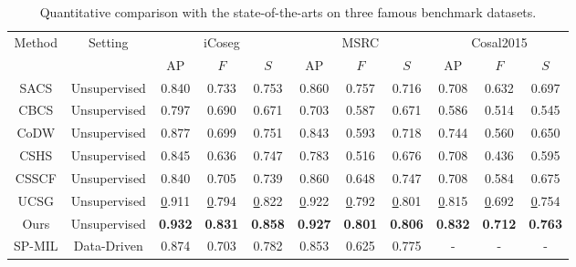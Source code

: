 \documentclass[sigconf]{acmart}
\begin{document}
\begin{table}[!tbp]
\caption{Quantitative comparison with the state-of-the-arts on three famous benchmark datasets.}
\begin{tabular}{c|c|ccc|ccc|ccc}
\toprule
\multirow{2}{*}{Method} & \multirow{2}{*}{Setting} & \multicolumn{3}{c|}{iCoseg}                      & \multicolumn{3}{c|}{MSRC}                        & \multicolumn{3}{c}{Cosal2015}                   \\ \cline{3-11} 
                        &                          & AP             & $F$              & $S$              & AP             & $F$              & $S$              & AP             & $F$              & $S$              \\ \hline
SACS                    & Unsupervised             & 0.840          & 0.733          & 0.753          & 0.860          & 0.757          & 0.716          & 0.708          & 0.632          & 0.697          \\
CBCS                    & Unsupervised             & 0.797          & 0.690          & 0.671          & 0.703          & 0.587          & 0.671          & 0.586          & 0.514          & 0.545          \\
CoDW                    & Unsupervised             & 0.877          & 0.699          & 0.751          & 0.843          & 0.593          & 0.718          & 0.744          & 0.560          & 0.650          \\
CSHS                    & Unsupervised             & 0.845          & 0.636          & 0.747          & 0.783          & 0.516          & 0.676          & 0.708          & 0.436          & 0.595          \\
CSSCF                   & Unsupervised             & 0.840          & 0.705          & 0.739          & 0.860          & 0.648          & 0.747          & 0.708          & 0.584          & 0.675          \\
UCSG                    & Unsupervised             & {\ul 0.911}    & {\ul 0.794}    & {\ul 0.822}    & {\ul 0.922}    & {\ul 0.792}    & {\ul 0.801}    & {\ul 0.815}    & {\ul 0.692}    & {\ul 0.754}    \\
Ours                    & Unsupervised             & \textbf{0.932} & \textbf{0.831} & \textbf{0.858} & \textbf{0.927} & \textbf{0.801} & \textbf{0.806} & \textbf{0.832} & \textbf{0.712} & \textbf{0.763} \\ \hline
SP-MIL                  & Data-Driven              & 0.874          & 0.703          & 0.782          & 0.853          & 0.625          & 0.775          & -              & -              & -              \\

\end{tabular}
\end{table}
\end{document}
